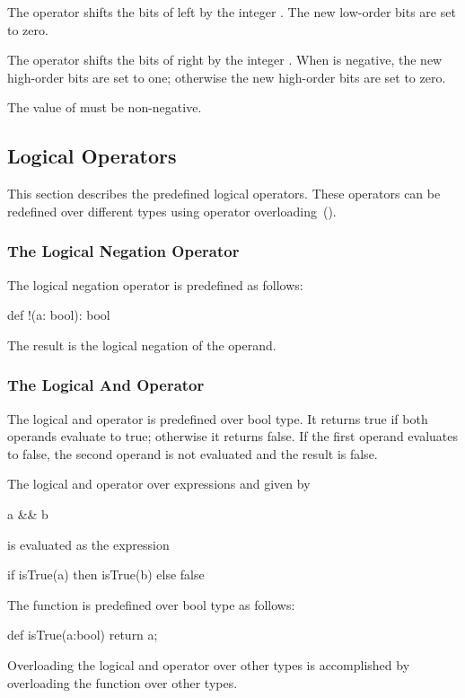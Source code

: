 The \chpl{<<} operator shifts the bits of  left by the
integer .  The new low-order bits are set to zero.

The \chpl{>>} operator shifts the bits of  right by the
integer .  When  is negative, the new high-order bits
are set to one; otherwise the new high-order bits are set to zero.

The value of  must be non-negative.

\subsection{Logical Operators}
\label{Logical_Operators}

This section describes the predefined logical operators.  These
operators can be redefined over different types using operator
overloading~().

\subsubsection{The Logical Negation Operator}
\label{Logical_Negation_Operators}

The logical negation operator is predefined as follows:
\begin{chapel}
def !(a: bool): bool
\end{chapel}
The result is the logical negation of the operand.

\subsubsection{The Logical And Operator}
\label{Logical_And_Operators}

The logical and operator is predefined over bool type.  It returns
true if both operands evaluate to true; otherwise it returns false.
If the first operand evaluates to false, the second operand is not
evaluated and the result is false.

The logical and operator over expressions  and  given
by
\begin{chapel}
a && b
\end{chapel}
is evaluated as the expression
\begin{chapel}
if isTrue(a) then isTrue(b) else false
\end{chapel}

The function  is predefined over bool type as follows:
\begin{chapel}
def isTrue(a:bool) return a;
\end{chapel}
Overloading the logical and operator over other types is accomplished
by overloading the  function over other types.

